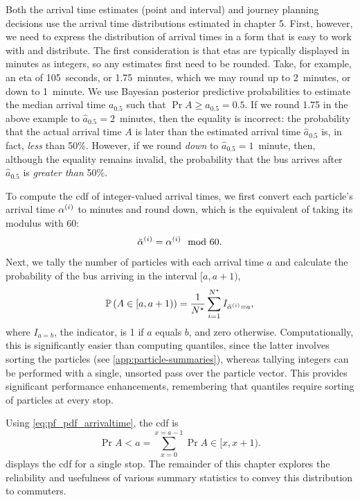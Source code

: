Both the arrival time estimates (point and interval) and journey planning decisions use the arrival time distributions estimated in chapter 5. First, however, we need to express the distribution of arrival times in a form that is easy to work with and distribute. The first consideration is that \glspl{eta} are typically displayed in minutes as integers, so any estimates first need to be rounded. Take, for example, an \gls{eta} of 105~seconds, or 1.75~minutes, which we may round up to 2~minutes, or down to 1~minute. We use Bayesian posterior predictive probabilities to estimate the median arrival time $a_{0.5}$ such that $\Pr{A \geq a_{0.5}} = 0.5$. If we round 1.75 in the above example to $\hat a_{0.5} = 2$~minutes, then the equality is incorrect: the probability that the actual arrival time $A$ is later than the estimated arrival time $\hat a_{0.5}$ is, in fact, \emph{less} than 50\%. However, if we round \emph{down} to $\hat a_{0.5} = 1$~minute, then, although the equality remains invalid, the probability that the bus arrives after $\hat a_{0.5}$ is \emph{greater than} 50\%.


To compute the \gls{cdf} of integer-valued arrival times, we first convert each particle's arrival time $\alpha^{(i)}$ to minutes and round down, which is the equivalent of taking its modulus with 60:
\begin{equation}
\label{eq:particle_eta_modulus}
\breve{\alpha}^{(i)} = \alpha^{(i)} \mod 60.
\end{equation}
Next, we tally the number of particles with each arrival time $a$ and calculate the probability of the bus arriving in the interval $[a, a+1)$,
\begin{equation}
\label{eq:pf_pdf_arrivaltime}
\mathbb{P}\left(A \in [a, a+1)\right) =
\frac{1}{N^\star} \sum_{i=1}^{N^\star} I_{\breve{\alpha}^{(i)} = a},
\end{equation}
where $I_{a=b}$, the indicator, is 1 if $a$ equals $b$, and zero otherwise. Computationally, this is significantly easier than computing quantiles, since the latter involves sorting the particles (see \cref{app:particle-summaries}), whereas tallying integers can be performed with a single, unsorted pass over the particle vector. This provides significant performance enhancements, remembering that quantiles require sorting of particles at every stop.


Using \cref{eq:pf_pdf_arrivaltime}, the \gls{cdf} is
\begin{equation}
\label{eq:pf_cdf_arrivaltime}
\Pr{A < a} = \sum_{x=0}^{x=a-1} \Pr{A \in [x, x+1)}.
\end{equation}
 displays the \gls{cdf} for a single stop. The remainder of this chapter explores the reliability and usefulness of various summary statistics to convey this distribution to commuters.

